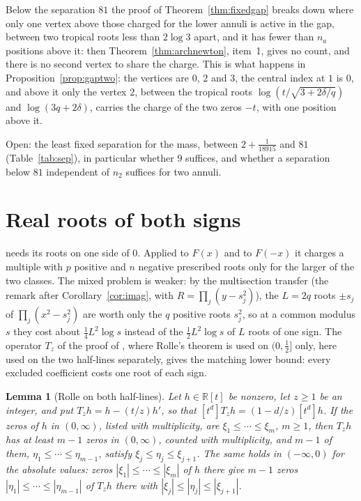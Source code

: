 \documentclass[11pt]{article}
\newtheorem{lemma}[theorem]{Lemma}
\newcommand{\R}{\mathbb R}
\begin{document}
Below the separation $81$ the proof of Theorem~\ref{thm:fixedgap} breaks
down where only one vertex above those charged for the lower annuli is
active in the gap, between two tropical roots less than $2\log3$ apart, and
it has fewer than $n_a$ positions above it: then
Theorem~\ref{thm:archnewton}, item~1, gives no count, and there is no
second vertex to share the charge.  This is what happens in
Proposition~\ref{prop:gaptwo}: the vertices are $0$, $2$ and $3$, the
central index at $1$ is $0$, and above it only the vertex $2$, between the
tropical roots $\log(t/\sqrt{3+2\delta/q})$ and $\log(3q+2\delta)$, carries
the charge of the two zeros $-t$, with one position above it.

Open: the least fixed separation for the mass, between $2+\frac1{18915}$
and $81$ (Table~\ref{tab:sep}), in particular whether $9$ suffices, and
whether a separation below $81$ independent of $n_2$ suffices for two
annuli.

\section{Real roots of both signs}\label{sec:bothsigns}

\cite[Theorem~3.2]{coefficient-mass} needs its roots on one side of $0$.  Applied to $F(x)$
and to $F(-x)$ it charges a multiple with $p$ positive and $n$ negative
prescribed roots only for the larger of the two classes.  The mixed problem is
weaker: by the multisection transfer (the remark after
Corollary~\ref{cor:imag}, with $R=\prod_j(y-s_j^2)$), the $L=2q$ roots $\pm s_j$
of $\prod_j(x^2-s_j^2)$ are worth only the $q$ positive roots $s_j^2$, so at a
common modulus $s$ they cost about $\frac14L^2\log s$ instead of the
$\frac12L^2\log s$ of $L$ roots of one sign.  The operator $T_z$ of the
proof of \cite[Proposition~4.2]{coefficient-mass}, where Rolle's theorem is
used on $(0,\tfrac12]$ only, here used on the two half-lines separately,
gives the matching lower bound: every excluded coefficient costs one root of
each sign.

\begin{lemma}[Rolle on both half-lines]\label{lem:rolleside}
Let $h\in\R[t]$ be nonzero, let $z\ge1$ be an integer, and put
$T_zh=h-(t/z)h'$, so that $[t^d]T_zh=(1-d/z)[t^d]h$.  If the zeros of $h$ in
$(0,\infty)$, listed with multiplicity, are $\xi_1\le\cdots\le\xi_m$, $m\ge1$, then $T_zh$ has
at least $m-1$ zeros in $(0,\infty)$, counted with multiplicity, and $m-1$ of
them, $\eta_1\le\cdots\le\eta_{m-1}$, satisfy $\xi_j\le\eta_j\le\xi_{j+1}$.
The same holds in $(-\infty,0)$ for the
absolute values: zeros $|\xi_1|\le\cdots\le|\xi_m|$ of $h$ there give
$m-1$ zeros $|\eta_1|\le\cdots\le|\eta_{m-1}|$ of $T_zh$ there with
$|\xi_j|\le|\eta_j|\le|\xi_{j+1}|$.
\end{lemma}
\end{document}
